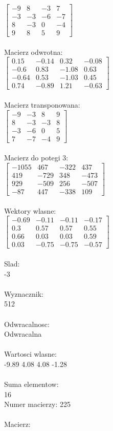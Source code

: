 \documentclass[a4paper,12pt]{article}
\begin{document}
$\begin{bmatrix} -9&8&-3&7\\-3&-3&-6&-7\\8&-3&0&-4\\9&8&5&9 \end{bmatrix}$
\\
\\
Macierz odwrotna:\\

$\begin{bmatrix} 0.15&-0.14&0.32&-0.08\\-0.6&0.83&-1.08&0.63\\-0.64&0.53&-1.03&0.45\\0.74&-0.89&1.21&-0.63 \end{bmatrix}$
\\
\\
Macierz transponowana:\\

$\begin{bmatrix} -9&-3&8&9\\8&-3&-3&8\\-3&-6&0&5\\7&-7&-4&9 \end{bmatrix}$
\\
\\
Macierz do potegi 3:\\

$\begin{bmatrix} -1055&467&-322&437\\419&-729&348&-473\\929&-509&256&-507\\-87&447&-338&109 \end{bmatrix}$
\\
\\
Wektory wlasne:\\

$\begin{bmatrix} -0.69&-0.11&-0.11&-0.17\\0.3&0.57&0.57&0.55\\0.66&0.03&0.03&0.59\\0.03&-0.75&-0.75&-0.57 \end{bmatrix}$
\\
\\
Slad:\\
-3
\\
\\
Wyznacznik:\\
512
\\
\\
Odwracalnosc:\\
Odwracalna
\\
\\
Wartosci wlasne:\\
-9.89 4.08 4.08 -1.28
\\
\\
Suma elementow:\\
16
\\
\newpage
Numer macierzy:
225
\\
\\
Macierz:\\
\end{document}
